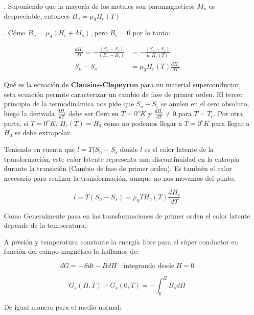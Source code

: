 . Suponiendo que la mayoría de los metales son paramagneticos $M_{n}$ es despreciable, entonces $B_{n}=\mu_{0}H_{c}(T)$

. Cómo $B_{n}=\mu_{0}(H_{c}+M_{s})$, pero $B_{s}=0$ por lo tanto:

\begin{equation}
\begin{aligned}
	\frac{dH_{c}}{dT} = -\frac{(S_{n}-S_{s})}{(B_{n}-B_{s})} & =  -\frac{(S_{n}-S_{s})}{\mu_{0}H_{c}(T)} \\
	S_{n}-S_{s} & = \mu_{0}H_{c}(T)\frac{dH_{c}}{dT}
\end{aligned}
\end{equation}

Qué es la ecuación de \textbf{Clausius-Clapeyron} para un material superconductor, esta ecuación permite caracterizar un cambio de fase de primer orden. El tercer principio de la termodinámica nos pide que $S_{n}-S_{s}$ se anulen en el cero absoluto, luego la derivada $\frac{dH_{c}}{dT}$ debe ser Cero en $T=0^{o}K$ y $\frac{dH_{c}}{dT} \neq 0$ para $T=T_{c}$. Por otra parte, si $T=0^{o}K$, $H_{c}(T)=H_{0}$ como no podemos llegar a $T=0^{o}K$ para llegar a $H_{0}$ se debe extrapolar.

Teniendo en cuenta que $l=T(S_{n}-S_{s}$ donde $l$ es el calor latente de la transformación, este calor latente representa una discontinuidad en la entropía durante la transición (Cambio de fase de primer orden). Es también el calor necesario para realizar la transformación, aunque no nos movamos del punto.

\begin{equation}
	l = T(S_{n}-S_{s}) = \mu_{0}TH_{c}(T)\frac{dH_{c}}{dT}
\end{equation}

Como Generalmente pasa en las transformaciones de primer orden el calor latente depende de la temperatura.

A presión y temperatura constante la energía libre para el súper conductor en función del campo magnético la hallamos de:



\begin{equation*}
dG=-Sdt-BdH \quad \text{integrando desde} \; H=0
\end{equation*}

\begin{equation*}
G_{s}(H, T)-G_{s}(0, T) = -\int_{0}^{H} B_{s}dH
\end{equation*}

De igual manera para el medio normal:

